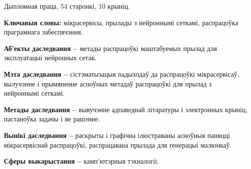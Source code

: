 Дыпломная праца, 54 старонкі, 10 крыніц.

\textbf{Ключавыя словы:} мікрасервісы, прылады з нейроннымі сеткамі, распрацоўка праграмнага забеспячэння.

\textbf{Аб'екты даследвання --} метады распрацоўкі маштабуемых прылад для эксплуатацыі нейронных сетак.

\textbf{Мэта даследвання --} сістэматызацыя падыходаў да распрацоўкі мікрасервісаў, вылучэнне і прымяненне асноўных метадаў распрацоўкі для прылад з нейроннымі сеткамі.

\textbf{Метады даследвання --} вывучэнне адпаведнай літаратуры і электронных крыніц, пастаноўка задачы і яе рашэнне.

\textbf{Вынікі даследвання --} раскрыты і графічна ілюстраваны асноўныя паняцці мікрасервіснай распрацоўкі, распрацавана прылада для генерацыі малюнкаў.

\textbf{Сферы выкарыстання --} камп'ютэрныя тэхналогіі.

\newpage